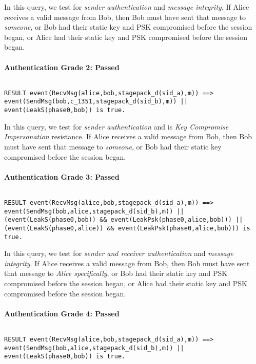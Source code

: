 In this query, we test for \emph{sender authentication} and \emph{message integrity}. If Alice receives a valid message from Bob, then Bob must have sent that message to \emph{someone}, or Bob had their static key and PSK compromised before the session began, or Alice had their static key and PSK compromised before the session began.


\paragraph{Authentication Grade 2: Passed}$ $
\begin{lstlisting}
RESULT event(RecvMsg(alice,bob,stagepack_d(sid_a),m)) ==> event(SendMsg(bob,c_1351,stagepack_d(sid_b),m)) || event(LeakS(phase0,bob)) is true.
\end{lstlisting}

In this query, we test for \emph{sender authentication} and is \emph{Key Compromise Impersonation} resistance. If Alice receives a valid message from Bob, then Bob must have sent that message to \emph{someone}, or Bob had their static key compromised before the session began.


\paragraph{Authentication Grade 3: Passed}$ $
\begin{lstlisting}
RESULT event(RecvMsg(alice,bob,stagepack_d(sid_a),m)) ==> event(SendMsg(bob,alice,stagepack_d(sid_b),m)) || (event(LeakS(phase0,bob)) && event(LeakPsk(phase0,alice,bob))) || (event(LeakS(phase0,alice)) && event(LeakPsk(phase0,alice,bob))) is true.
\end{lstlisting}

In this query, we test for \emph{sender and receiver authentication} and \emph{message integrity}. If Alice receives a valid message from Bob, then Bob must have sent that message to \emph{Alice specifically}, or Bob had their static key and PSK compromised before the session began, or Alice had their static key and PSK compromised before the session began.


\paragraph{Authentication Grade 4: Passed}$ $
\begin{lstlisting}
RESULT event(RecvMsg(alice,bob,stagepack_d(sid_a),m)) ==> event(SendMsg(bob,alice,stagepack_d(sid_b),m)) || event(LeakS(phase0,bob)) is true.
\end{lstlisting}


